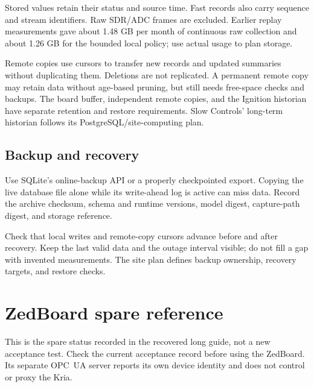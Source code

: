 \documentclass[11pt]{article}
\begin{document}
Stored values retain their status and source time. Fast records also carry sequence and stream identifiers. Raw SDR/ADC frames are excluded. Earlier replay measurements gave about 1.48 GB per month of continuous raw collection and about 1.26 GB for the bounded local policy; use actual usage to plan storage.

Remote copies use cursors to transfer new records and updated summaries without duplicating them. Deletions are not replicated. A permanent remote copy may retain data without age-based pruning, but still needs free-space checks and backups. The board buffer, independent remote copies, and the Ignition historian have separate retention and restore requirements. Slow Controls' long-term historian follows its PostgreSQL/site-computing plan.

\subsection{Backup and recovery}

Use SQLite's online-backup API or a properly checkpointed export. Copying the live database file alone while its write-ahead log is active can miss data. Record the archive checksum, schema and runtime versions, model digest, capture-path digest, and storage reference.

Check that local writes and remote-copy cursors advance before and after recovery. Keep the last valid data and the outage interval visible; do not fill a gap with invented measurements. The site plan defines backup ownership, recovery targets, and restore checks.

\section{ZedBoard spare reference}
\label{sec:zed-spare}

This is the spare status recorded in the recovered long guide, not a new acceptance test. Check the current acceptance record before using the ZedBoard. Its separate OPC~UA server reports its own device identity and does not control or proxy the Kria.
\end{document}
